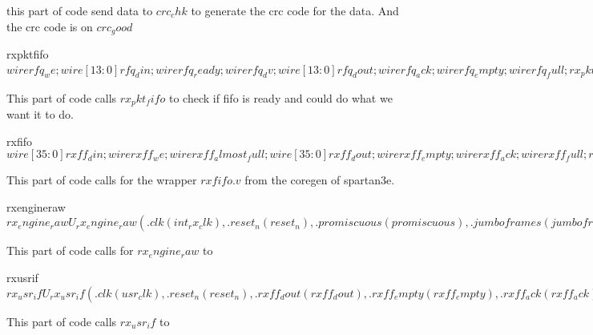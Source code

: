 this part of code send data to $crc_chk$ to generate the crc code for the data.
And the crc code is on $crc_good$

\begin{chunk}{rxpktfifo}
$
wire rfq_we;
wire [13:0] rfq_din;
wire rfq_ready;
wire rfq_dv;
wire [13:0] rfq_dout;
wire rfq_ack;
wire rfq_empty;
wire rfq_full;

rx_pkt_fifo U_rx_pkt_fifo
  (.reset_n(reset_n), .int_rx_clk(int_rx_clk), .usr_clk(usr_clk),
   .we(rfq_we), .din(rfq_din), .ready(rfq_ready),
   .dv(rfq_dv), .dout(rfq_dout), .ack(rfq_ack),
   .fifo_empty(rfq_empty), .fifo_full(rfq_full));
$
\end{chunk}

This part of code calls $rx_pkt_fifo$ to check if fifo is ready and could do what we want it to do.


\begin{chunk}{rxfifo}
$
wire [35:0] rxff_din;
wire rxff_we;
wire rxff_almost_full;
wire [35:0] rxff_dout;
wire rxff_empty;
wire rxff_ack;
wire rxff_full;
rxfifo U_rxfifo
  (.rst(~reset_n),
   .wr_clk(int_rx_clk), .din(rxff_din), .wr_en(rxff_we), 
   .full(rxff_full), .almost_full(rxff_almost_full),
   .rd_clk(usr_clk), .dout(rxff_dout), .rd_en(rxff_ack), .empty(rxff_empty));
$
\end{chunk}

This part of code calls for the wrapper $rxfifo.v$ from the coregen of spartan3e.

\begin{chunk}{rxengineraw}
$
rx_engine_raw U_rx_engine_raw
  (.clk(int_rx_clk), .reset_n(reset_n),
   .promiscuous(promiscuous), .jumboframes(jumboframes),
   .mac_addr_filter(mac_addr_filter), .rx_count(rx_count),
   .int_rx_din(int_rx_din), .int_rx_dv(int_rx_dv), .int_rx_er(int_rx_er),
   .crc_init(crc_init), .crc_data(crc_data), .crc_good(crc_good),
   .rxff_din(rxff_din), .rxff_we(rxff_we), .rxff_almost_full(rxff_almost_full),
   .rfq_din(rfq_din), .rfq_we(rfq_we), .rfq_ready(rfq_ready));
$
\end{chunk}

This part of code calls for $rx_engine_raw$ to 


\begin{chunk}{rxusrif}
$
rx_usr_if U_rx_usr_if
  (.clk(usr_clk), .reset_n(reset_n),
   .rxff_dout(rxff_dout), .rxff_empty(rxff_empty), .rxff_ack(rxff_ack),
   .rfq_dout(rfq_dout), .rfq_dv(rfq_dv), .rfq_ack(rfq_ack),
   .rx_data(rx_data), .rx_dv(rx_dv), .rx_sof(rx_sof), .rx_ack(rx_ack),
   .debug());
assign debug = { rfq_full, rfq_empty };
$
\end{chunk}

This part of code calls $rx_usr_if$ to 


